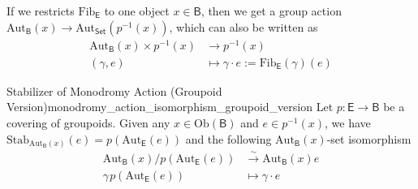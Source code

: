 \documentclass{report}
\begin{document}
If we restricts $\mathrm{Fib}_{\mathsf{E}}$ to one object $x\in\mathsf{B}$, then we get a group action $\mathrm{Aut}_{\mathsf{B}}(x)\to\mathrm{Aut}_{\mathsf{Set}}(p^{-1}(x))$, which can also be written as
\begin{align*}
	\mathrm{Aut}_{\mathsf{B}}(x)\times p^{-1}(x) &\longrightarrow p^{-1}(x)\\
	(\gamma, e) &\longmapsto \gamma\cdot e:=\mathrm{Fib}_{\mathsf{E}}(\gamma)(e)
\end{align*}

\begin{proposition}{Stabilizer of Monodromy Action (Groupoid Version)}{monodromy_action_isomorphism_groupoid_version}
	Let $p:\mathsf{E}\to\mathsf{B}$ be a covering of groupoids. Given any $x\in\mathrm{Ob}\left(\mathsf{B}\right)$ and $e\in p^{-1}(x)$, we have $\mathrm{Stab}_{\mathrm{Aut}_{\mathsf{B}}(x)}(e)=p(\mathrm{Aut}_{\mathsf{E}}(e))$ and the following $\mathrm{Aut}_{\mathsf{B}}(x)$-set isomorphism
	\begin{align*}
		\mathrm{Aut}_{\mathsf{B}}(x)/p(\mathrm{Aut}_{\mathsf{E}}(e)) &\stackrel{\sim}{\longrightarrow} \mathrm{Aut}_{\mathsf{B}}(x)e\\
		\gamma\hspace{1pt}p(\mathrm{Aut}_{\mathsf{E}}(e)) &\longmapsto \gamma\cdot e
	\end{align*}
\end{proposition}
\end{document}
